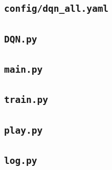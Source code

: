 \documentclass[UTF8,a4paper,12pt]{ctexart}
\begin{document}
\subsection{\texttt{config/dqn\_all.yaml}}


\subsection{\texttt{DQN.py}}


\subsection{\texttt{main.py}}


\subsection{\texttt{train.py}}


\subsection{\texttt{play.py}}


\subsection{\texttt{log.py}}

\end{document}
